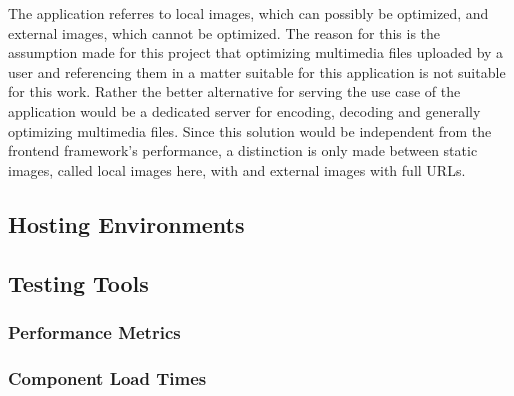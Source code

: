 \documentclass[a4paper, fontsize=11pt]{article}
\begin{document}
The application referres to local images, which can possibly be optimized, and external images, which cannot be optimized.
The reason for this is the assumption made for this project that optimizing multimedia files uploaded by a user and referencing them in a matter suitable for this application is not suitable for this work.
Rather the better alternative for serving the use case of the application would be a dedicated server for encoding, decoding and generally optimizing multimedia files.
Since this solution would be independent from the frontend framework's performance, a distinction is only made between static images, called local images here, with and external images with full URLs.

\subsection{Hosting Environments}\label{subsec:hostingenvironments}
% 
% 


\subsection{Testing Tools}\label{subsec:testingtools}
% 
% 

\subsubsection{Performance Metrics}
% 

\subsubsection{Component Load Times}
% 
\end{document}
